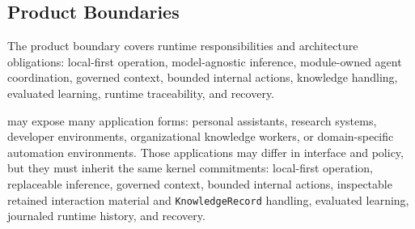 \documentclass[11pt]{report}
\begin{document}
\subsection{Product Boundaries}

The product boundary covers runtime responsibilities and architecture obligations: local-first operation, model-agnostic inference, module-owned agent coordination, governed context, bounded internal actions, knowledge handling, evaluated learning, runtime traceability, and recovery.

\Madre may expose many application forms: personal assistants, research systems, developer environments, organizational knowledge workers, or domain-specific automation environments. Those applications may differ in interface and policy, but they must inherit the same kernel commitments: local-first operation, replaceable inference, governed context, bounded internal actions, inspectable retained interaction material and \texttt{KnowledgeRecord} handling, evaluated learning, journaled runtime history, and recovery.

\end{document}
